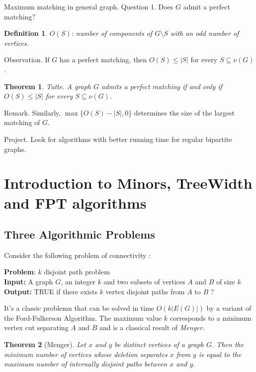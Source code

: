\documentclass[12pt,a4paper]{article}
\newtheorem{theorem}{Theorem}
\newtheorem{definition}{Definition}
\begin{document}
Maximum matching in general graph.  Question 1.  Does \(G\) admit a perfect
matching?

\begin{definition}
  \(O(S)\): number of components of \(G \setminus S\) with an odd number of
  vertices.
\end{definition}

Observation.  If \(G\) has a perfect matching, then \(O(S) \leq |S|\) for every
\(S \subseteq \nu(G)\).

\begin{theorem}
  Tutte.  A graph \(G\) admits a perfect matching if and only if
  \(O(S) \leq |S|\) for every \(S \subseteq \nu(G)\).
\end{theorem}

Remark.  Similarly, \(\max\{O(S) - |S|, 0\}\) determines the size of the largest
matching of \(G\).

Project.  Look for algorithms with better running time for regular bipartite
graphs.

\section{Introduction to Minors, TreeWidth and FPT algorithms}
\subsection{Three Algorithmic Problems}
Consider the following problem of connectivity :

\vspace{0.2cm}
\noindent \textbf{Problem}: $k$ disjoint path problem\\
\textbf{Input:} A graph $G$, an integer $k$ and two subsets of vertices $A$ and $B$ of size $k$\\
\textbf{Output:} TRUE if there exists $k$ vertex disjoint paths from $A$ to $B$ ?\\
\vspace{0.2cm}

\noindent It's a classic problemn that can be solved in time $O(k|E(G)|)$ by a variant of the Ford-Fulkerson Algorithm.
The maximum value $k$ corresponds to a minimum vertex cut separating $A$ and $B$ and is a classical result of \textit{Menger}.

\begin{theorem}[Menger]
Let $x$ and $y$ be distinct vertices of a graph $G$. Then the minimum number of vertices whose deletion separates $x$ from $y$ is equal to the maximum number of internally disjoint paths between $x$ and $y$.
\end{theorem}
\end{document}
